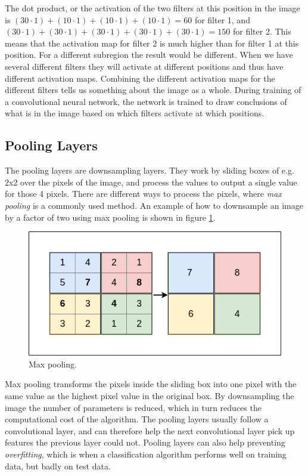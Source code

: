 The dot product, or the activation of the two filters at this position in the image is $(30 \cdot 1) + (10 \cdot 1) + (10 \cdot 1) + (10 \cdot 1) = 60$ for filter 1, and $(30 \cdot 1) + (30 \cdot 1) + (30 \cdot 1) + (30 \cdot 1) + (30 \cdot 1) = 150$ for filter 2. This means that the activation map for filter 2 is much higher than for filter 1 at this position. For a different subregion the result would be different. When we have several different filters they will activate at different positions and thus have different activation maps. Combining the different activation maps for the different filters tells us something about the image as a whole. During training of a convolutional neural network, the network is trained to draw conclusions of what is in the image based on which filters activate at which positions. 

\vspace{2mm}


\subsection{Pooling Layers}
The pooling layers are downsampling layers. They work by sliding boxes of e.g. 2x2 over the pixels of the image, and process the values to output a single value for those 4 pixels. There are different ways to process the pixels, where \textit{max pooling} is a commonly used method. An example of how to downsample an image by a factor of two using max pooling is shown in figure \ref{fig:max_pool}.

\begin{figure}[h!]
    \centering
    \includegraphics[scale=0.42]{fig/pooling.png}
    \caption{Max pooling.}
    \label{fig:max_pool}
\end{figure}

Max pooling transforms the pixels inside the sliding box into one pixel with the same value as the highest pixel value in the original box. By downsampling the image the number of parameters is reduced, which in turn reduces the computational cost of the algorithm. The pooling layers usually follow a convolutional layer, and can therefore help the next convolutional layer pick up features the previous layer could not. Pooling layers can also help preventing \textit{overfitting}, which is when a classification algorithm performs well on training data, but badly on test data.

